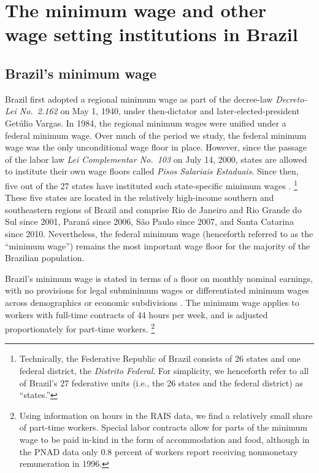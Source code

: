 
\section{The minimum wage and other wage setting institutions in Brazil\label{SECTION: Institutions}}

\subsection{Brazil's minimum wage}

Brazil first adopted a regional minimum wage as part of the decree-law \emph{Decreto-Lei No.\ 2.162} on May 1, 1940, under then-dictator and later-elected-president Get{\'{u}}lio Vargas. In 1984, the regional minimum wages were unified under a federal minimum wage. %
%
Over much of the period we study, the federal minimum wage was the only unconditional wage floor in place. However, since the passage of the labor law \emph{Lei Complementar No.\ 103} on July 14, 2000, states are allowed to institute their own wage floors called \emph{Pisos Salariais Estaduais}. Since then, five out of the 27 states have instituted such state-specific minimum wages \citep{CorseuilFogelHecksher2015,SaltielUrzua2020}.%
%
\footnote{Technically, the Federative Republic of Brazil consists of 26 states and one federal district, the \emph{Distrito Federal}. For simplicity, we henceforth refer to all of Brazil's 27 federative units (i.e., the 26 states and the federal district) as ``states.''} %
%
These five states are located in the relatively high-income southern and southeastern regions of Brazil and comprise Rio de Janeiro and Rio Grande do Sul since 2001, Paran{\'{a}} since 2006, S{\~{a}}o Paulo since 2007, and Santa Catarina since 2010. %
%
Nevertheless, the federal minimum wage (henceforth referred to as the ``minimum wage'') remains the most important wage floor for the majority of the Brazilian population.

Brazil's minimum wage is stated in terms of a floor on monthly nominal earnings, with no provisions for legal subminimum wages or differentiated minimum wages across demographics or economic subdivisions \citep{Lemos2004}. The minimum wage applies to workers with full-time contracts of 44 hours per week, and is adjusted proportionately for part-time workers.%
%
\footnote{Using information on hours in the RAIS data, we find a relatively small share of part-time workers. Special labor contracts allow for parts of the minimum wage to be paid in-kind in the form of accommodation
and food, although in the PNAD data only 0.8 percent of workers report receiving nonmonetary remuneration in 1996.} %


